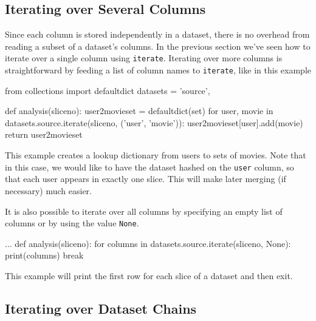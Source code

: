 \subsection{Iterating over Several Columns}
Since each column is stored independently in a dataset, there is no
overhead from reading a subset of a dataset's columns.  In the
previous section we've seen how to iterate over a single column using
\texttt{iterate}.  Iterating over more columns is straightforward by
feeding a list of column names to \texttt{iterate}, like in this
example
\begin{python}
from collections import defaultdict
datasets = {'source',}

def analysis(sliceno):
    user2movieset = defaultdict(set)
    for user, movie in datasets.source.iterate(sliceno, ('user', 'movie')):
    user2movieset[user].add(movie)
    return user2movieset
\end{python}
This example creates a lookup dictionary from users to sets of movies.
Note that in this case, we would like to have the dataset hashed on
the \texttt{user} column, so that each user appears in exactly one slice.
This will make later merging (if necessary) much easier.

It is also possible to iterate over all columns by specifying an empty
list of columns or by using the value \texttt{None}.
\begin{python}
...
def analysis(sliceno):
    for columns in datasets.source.iterate(sliceno, None):
    print(columns)
    break
\end{python}
This example will print the first row for each slice of a dataset and
then exit.


\subsection{Iterating over Dataset Chains}


